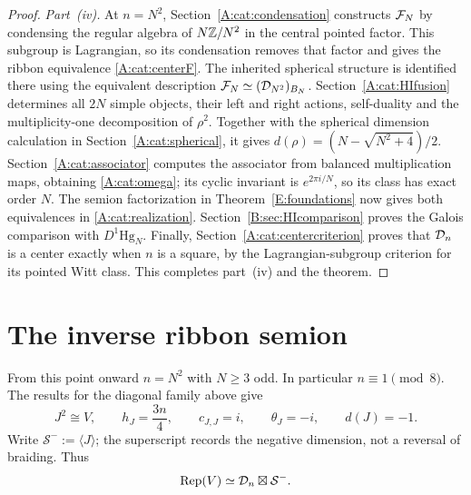 \documentclass[11pt]{article}
\newcommand{\Scat}{\mathcal S}\newcommand{\U}{\mathcal U}\newcommand{\bo}{\boxtimes}
\numberwithin{equation}{section}
\begin{document}
\begin{proof}
\emph{Part~\textup{(iv)}.} At $n=N^2$, Section~\ref{A:cat:condensation} constructs $\mathcal F_N$ by condensing the regular algebra of $N\mathbb Z/N^2$ in the central pointed factor. This subgroup is Lagrangian, so its condensation removes that factor and gives the ribbon equivalence \eqref{A:cat:centerF}. The inherited spherical structure is identified there using the equivalent description $\mathcal F_N\simeq(\mathcal D_{N^2})_{B_N}$. Section~\ref{A:cat:HIfusion} determines all $2N$ simple objects, their left and right actions, self-duality and the multiplicity-one decomposition of $\rho^2$. Together with the spherical dimension calculation in Section~\ref{A:cat:spherical}, it gives $d(\rho)=(N-\sqrt{N^2+4})/2$. Section~\ref{A:cat:associator} computes the associator from balanced multiplication maps, obtaining \eqref{A:cat:omega}; its cyclic invariant is $e^{2\pi i/N}$, so its class has exact order $N$. The semion factorization in Theorem~\ref{E:foundations} now gives both equivalences in \eqref{A:cat:realization}. Section~\ref{B:sec:HIcomparison} proves the Galois comparison with $D^1\mathrm{Hg}_N$. Finally, Section~\ref{A:cat:centercriterion} proves that $\mathcal D_n$ is a center exactly when $n$ is a square, by the Lagrangian-subgroup criterion for its pointed Witt class. This completes part~\textup{(iv)} and the theorem.
\end{proof}

\section{The inverse ribbon semion}\label{E:auxiliary}
From this point onward $n=N^2$ with $N\geq3$ odd. In particular $n\equiv1\pmod8$. The results for the diagonal family above give
\begin{equation}\label{E:Jdata}
J^2\cong V,\qquad h_J=\frac{3n}{4},\qquad
c_{J,J}=i,\qquad\theta_J=-i,\qquad d(J)=-1.
\end{equation}
Write $\Scat^-:=\langle J\rangle$; the superscript records the negative dimension, not a reversal of braiding. Thus
\[
\Rep(V)\simeq\D_n\bo\Scat^-.
\]
\end{document}
